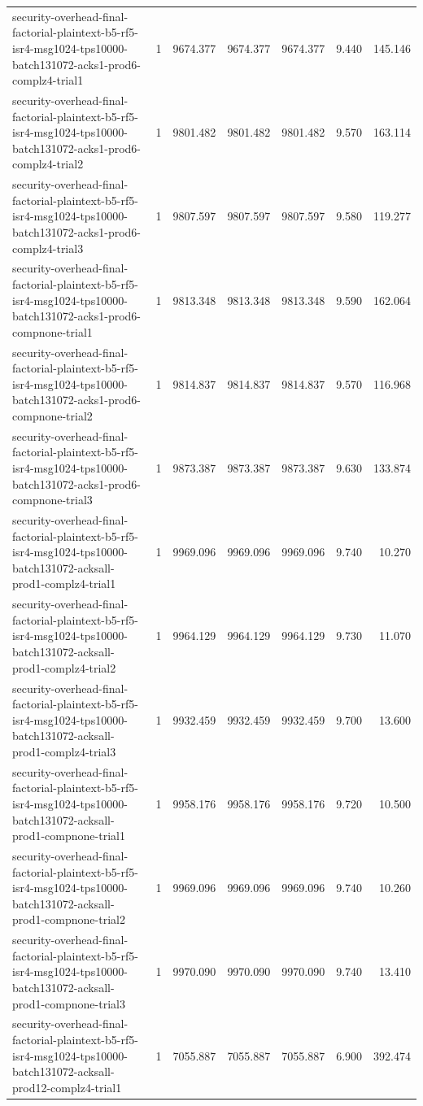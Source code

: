 \begin{tabular}{lrrrrrr}
security-overhead-final-factorial-plaintext-b5-rf5-isr4-msg1024-tps10000-batch131072-acks1-prod6-complz4-trial1 & 1 & 9674.377 & 9674.377 & 9674.377 & 9.440 & 145.146 \\
security-overhead-final-factorial-plaintext-b5-rf5-isr4-msg1024-tps10000-batch131072-acks1-prod6-complz4-trial2 & 1 & 9801.482 & 9801.482 & 9801.482 & 9.570 & 163.114 \\
security-overhead-final-factorial-plaintext-b5-rf5-isr4-msg1024-tps10000-batch131072-acks1-prod6-complz4-trial3 & 1 & 9807.597 & 9807.597 & 9807.597 & 9.580 & 119.277 \\
security-overhead-final-factorial-plaintext-b5-rf5-isr4-msg1024-tps10000-batch131072-acks1-prod6-compnone-trial1 & 1 & 9813.348 & 9813.348 & 9813.348 & 9.590 & 162.064 \\
security-overhead-final-factorial-plaintext-b5-rf5-isr4-msg1024-tps10000-batch131072-acks1-prod6-compnone-trial2 & 1 & 9814.837 & 9814.837 & 9814.837 & 9.570 & 116.968 \\
security-overhead-final-factorial-plaintext-b5-rf5-isr4-msg1024-tps10000-batch131072-acks1-prod6-compnone-trial3 & 1 & 9873.387 & 9873.387 & 9873.387 & 9.630 & 133.874 \\
security-overhead-final-factorial-plaintext-b5-rf5-isr4-msg1024-tps10000-batch131072-acksall-prod1-complz4-trial1 & 1 & 9969.096 & 9969.096 & 9969.096 & 9.740 & 10.270 \\
security-overhead-final-factorial-plaintext-b5-rf5-isr4-msg1024-tps10000-batch131072-acksall-prod1-complz4-trial2 & 1 & 9964.129 & 9964.129 & 9964.129 & 9.730 & 11.070 \\
security-overhead-final-factorial-plaintext-b5-rf5-isr4-msg1024-tps10000-batch131072-acksall-prod1-complz4-trial3 & 1 & 9932.459 & 9932.459 & 9932.459 & 9.700 & 13.600 \\
security-overhead-final-factorial-plaintext-b5-rf5-isr4-msg1024-tps10000-batch131072-acksall-prod1-compnone-trial1 & 1 & 9958.176 & 9958.176 & 9958.176 & 9.720 & 10.500 \\
security-overhead-final-factorial-plaintext-b5-rf5-isr4-msg1024-tps10000-batch131072-acksall-prod1-compnone-trial2 & 1 & 9969.096 & 9969.096 & 9969.096 & 9.740 & 10.260 \\
security-overhead-final-factorial-plaintext-b5-rf5-isr4-msg1024-tps10000-batch131072-acksall-prod1-compnone-trial3 & 1 & 9970.090 & 9970.090 & 9970.090 & 9.740 & 13.410 \\
security-overhead-final-factorial-plaintext-b5-rf5-isr4-msg1024-tps10000-batch131072-acksall-prod12-complz4-trial1 & 1 & 7055.887 & 7055.887 & 7055.887 & 6.900 & 392.474 \\

\end{tabular}
